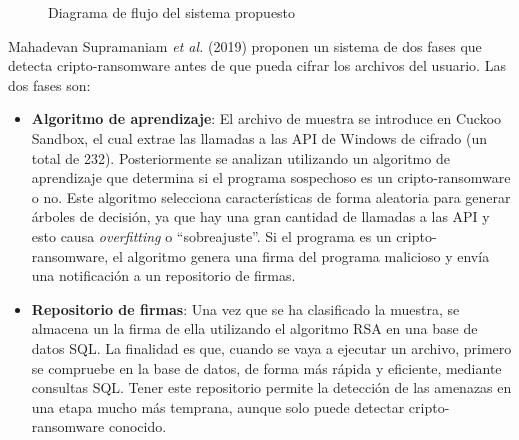 \begin{figure}[h!]
\begin{center}
{}
\end{center}
\caption{Diagrama de flujo del sistema propuesto \cite{detecting}}
\label{fig:detecting}
\end{figure}

Mahadevan Supramaniam \textit{et al.} (2019) \cite{Kok2019} proponen un sistema de dos fases que detecta cripto-ransomware antes de que pueda cifrar los archivos del usuario. Las dos fases son:

\begin{itemize}
    \item \textbf{Algoritmo de aprendizaje}: El archivo de muestra se introduce en Cuckoo Sandbox, el cual extrae las llamadas a las \gls{API} de Windows de cifrado (un total de 232). Posteriormente se analizan utilizando un algoritmo de aprendizaje que determina si el programa sospechoso es un cripto-ransomware o no. Este algoritmo selecciona características de forma aleatoria para generar árboles de decisión, ya que hay una gran cantidad de llamadas a las \gls{API} y esto causa \textit{overfitting} o ``sobreajuste''. Si el programa es un cripto-ransomware, el algoritmo genera una firma del programa malicioso y envía una notificación a un repositorio de firmas. 
    
    \item \textbf{Repositorio de firmas}: Una vez que se ha clasificado la muestra, se almacena un la firma de ella utilizando el algoritmo \gls{RSA} en una base de datos \gls{SQL}. La finalidad es que, cuando se vaya a ejecutar un archivo, primero se compruebe en la base de datos, de forma más rápida y eficiente, mediante consultas \gls{SQL}. Tener este repositorio permite la detección de las amenazas en una etapa mucho más temprana, aunque solo puede detectar cripto-ransomware conocido.
\end{itemize}


